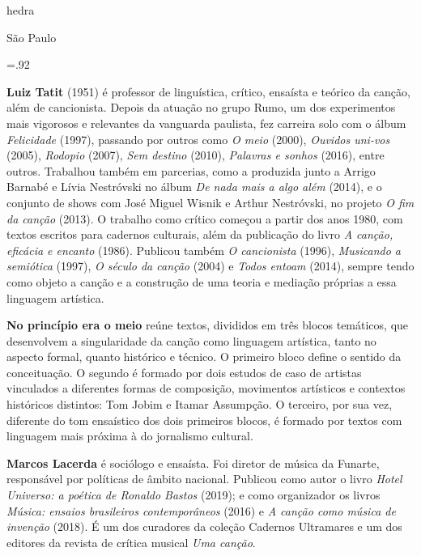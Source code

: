               \newfontfamily{}
              {\fontsize{30}{40}\selectfont \timesnewroman hedra}
              
              \medskip

              {\selectfont\minion\small
              São Paulo \quad\the\year}
\endgroup
\pagebreak

\begingroup 

\footnotesize\parindent0pt\parskip5pt\thispagestyle{empty} 
\vspace*{.1\textheight}\mbox{} \vfill
\baselineskip=.92\baselineskip
\thispagestyle{empty}

\textbf{Luiz Tatit} (1951) é professor de linguística, crítico, ensaísta e teórico da canção, além de cancionista. Depois da atuação no grupo Rumo, um dos experimentos mais vigorosos e relevantes da vanguarda paulista, fez carreira solo com o álbum \textit{Felicidade} (1997), passando por outros como \textit{O meio} (2000), \textit{Ouvidos uni-vos} (2005), \textit{Rodopio} (2007), \textit{Sem destino} (2010), \textit{Palavras e sonhos} (2016), entre outros. Trabalhou também em parcerias, como a produzida junto a Arrigo Barnabé e Lívia Nestróvski no álbum \textit{De nada mais a algo além} (2014), e o conjunto de shows com José Miguel Wisnik e Arthur Nestróvski, no projeto \textit{O fim da canção} (2013). O trabalho como crítico começou a partir dos anos 1980, com textos escritos para cadernos culturais, além da publicação do livro \textit{A canção, eficácia e encanto} (1986). Publicou também \textit{O cancionista} (1996), \textit{Musicando a semiótica} (1997), \textit{O século da canção} (2004) e \textit{Todos entoam} (2014), sempre tendo como objeto a canção e a construção de uma teoria e mediação próprias a essa linguagem artística.

\textbf{No princípio era o meio} reúne textos, divididos em três blocos temáticos, que desenvolvem a singularidade da canção como linguagem artística, tanto no aspecto formal, quanto histórico e técnico. O primeiro bloco define o sentido da conceituação. O segundo é formado por dois estudos de caso de artistas vinculados a diferentes formas de composição, movimentos artísticos e contextos históricos distintos: Tom Jobim e Itamar Assumpção. O terceiro, por sua vez, diferente do tom ensaístico dos dois primeiros blocos, é formado por textos com linguagem mais próxima à do jornalismo cultural.

\textbf{Marcos Lacerda} é sociólogo e ensaísta. Foi diretor de música da Funarte, responsável por políticas de âmbito nacional. Publicou como autor o livro \textit{Hotel Universo: a poética de Ronaldo Bastos} (2019); e como organizador os livros \textit{Música: ensaios brasileiros contemporâneos} (2016) e \textit{A canção como música de invenção} (2018). É um dos curadores da coleção Cadernos Ultramares e um dos editores da revista de crítica musical \textit{Uma canção}. 

\endgroup
\pagebreak



